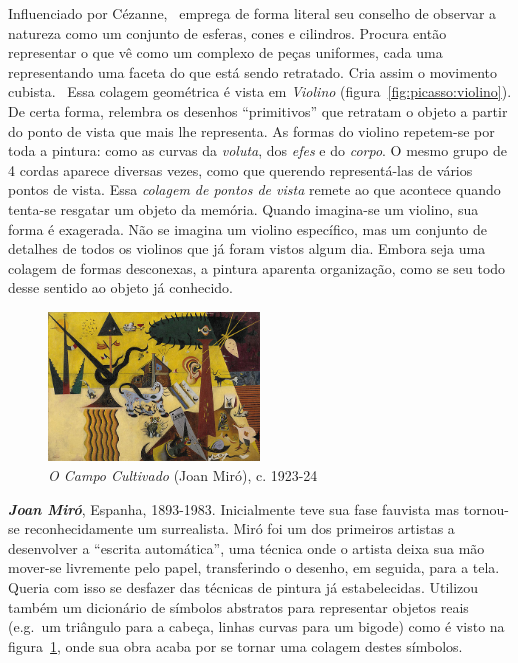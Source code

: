 Influenciado por Cézanne,~\cite{rishel} emprega de forma literal seu
conselho de observar a natureza como um conjunto de esferas, cones e
cilindros. Procura então representar o que vê como um complexo de
peças uniformes, cada uma representando uma faceta do que está sendo
retratado. Cria assim o movimento cubista.~\cite{barr,golding} Essa
colagem geométrica é vista em \emph{Violino}
(figura~\ref{fig:picasso:violino}). De certa forma, relembra os
desenhos ``primitivos'' que retratam o objeto a partir do ponto de
vista que mais lhe representa. As formas do violino repetem-se por
toda a pintura: como as curvas da \textit{voluta}, dos \textit{efes} e
do \textit{corpo}. O mesmo grupo de 4 cordas aparece diversas vezes,
como que querendo representá-las de vários pontos de
vista. Essa \textit{colagem de pontos de vista} remete ao que acontece
quando tenta-se resgatar um objeto da memória. Quando imagina-se um
violino, sua forma é exagerada. Não se imagina um violino específico,
mas um conjunto de detalhes de todos os violinos que já foram vistos
algum dia. Embora seja uma colagem de formas desconexas, a pintura
aparenta organização, como se seu todo desse sentido ao objeto já
conhecido.~\cite{gombrich}

\begin{figure}
  \vspace{-15pt}
  \begin{centering}
      \caption{\emph{O Campo Cultivado} (Joan Miró), c. 1923-24}
     \label{fig:miro:campo}
    \includegraphics[width=0.5\textwidth]{figs/miro_campo.png}
  \end{centering}
\end{figure}

\textbf{\emph{Joan Miró}}, Espanha, 1893-1983. Inicialmente teve sua fase
fauvista mas tornou-se reconhecidamente um surrealista. Miró foi um
dos primeiros artistas a desenvolver a ``escrita automática'', uma
técnica onde o artista deixa sua mão mover-se livremente pelo papel,
transferindo o desenho, em seguida, para a tela.~\cite{montagu} Queria
com isso se desfazer das técnicas de pintura já
estabelecidas. Utilizou também um dicionário de símbolos abstratos
para representar objetos reais (e.g.\ um triângulo para a cabeça,
linhas curvas para um bigode) como é visto na
figura~\ref{fig:miro:campo}, onde sua obra acaba por se tornar uma
colagem destes símbolos.~\cite{stich}

